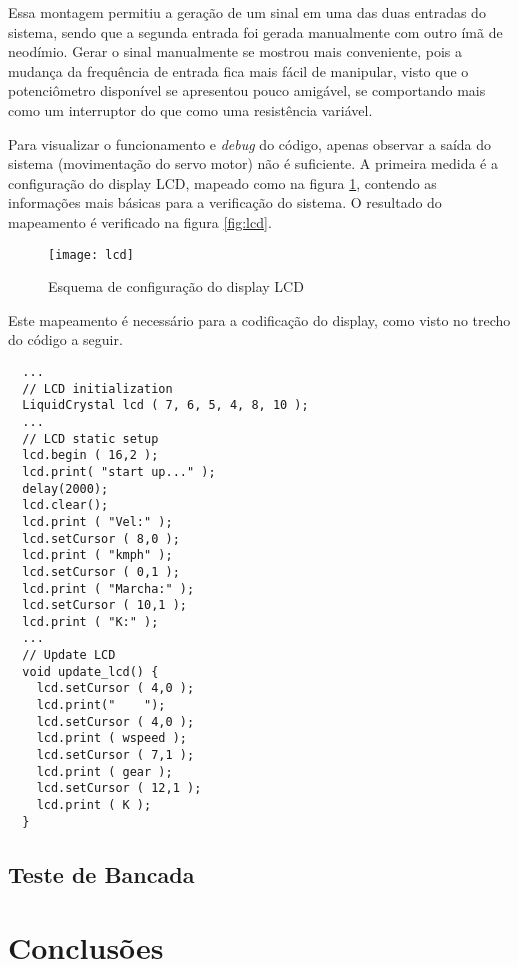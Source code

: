 \documentclass[a4paper,11pt]{article}
\begin{document}
Essa montagem permitiu a geração de um sinal em uma das duas entradas do
sistema, sendo que a segunda entrada foi gerada manualmente com outro ímã de
neodímio. Gerar o sinal manualmente se mostrou mais conveniente, pois a mudança
da frequência de entrada fica mais fácil de manipular, visto que o
potenciômetro disponível se apresentou pouco amigável, se comportando mais como
um interruptor do que como uma resistência variável.

Para visualizar o funcionamento e \textit{debug} do código, apenas observar a
saída do sistema (movimentação do servo motor) não é suficiente. A primeira
medida é a configuração do display LCD, mapeado como na figura
\ref{fig:schemalcd}, contendo as informações mais básicas para a verificação do
sistema. O resultado do mapeamento é verificado na figura \ref{fig:lcd}.

\begin{figure}[h!]
\begin{center}
  \texttt{[image: lcd]}
\end{center}
  \caption{Esquema de configuração do display LCD}
  \label{fig:schemalcd}
\end{figure}

Este mapeamento é necessário para a codificação do display, como visto no
trecho do código a seguir.
\begin{lstlisting}
  ...
  // LCD initialization
  LiquidCrystal lcd ( 7, 6, 5, 4, 8, 10 );
  ...
  // LCD static setup
  lcd.begin ( 16,2 );
  lcd.print( "start up..." );
  delay(2000);
  lcd.clear();
  lcd.print ( "Vel:" );
  lcd.setCursor ( 8,0 );
  lcd.print ( "kmph" );
  lcd.setCursor ( 0,1 );
  lcd.print ( "Marcha:" );
  lcd.setCursor ( 10,1 );
  lcd.print ( "K:" );
  ...
  // Update LCD
  void update_lcd() {
    lcd.setCursor ( 4,0 );
    lcd.print("    ");
    lcd.setCursor ( 4,0 );
    lcd.print ( wspeed );
    lcd.setCursor ( 7,1 );
    lcd.print ( gear );
    lcd.setCursor ( 12,1 );
    lcd.print ( K );
  }
\end{lstlisting}


\subsection{Teste de Bancada}

\pagebreak
%
\section{Conclusões}
\label{sec:conclusoes}
\end{document}

